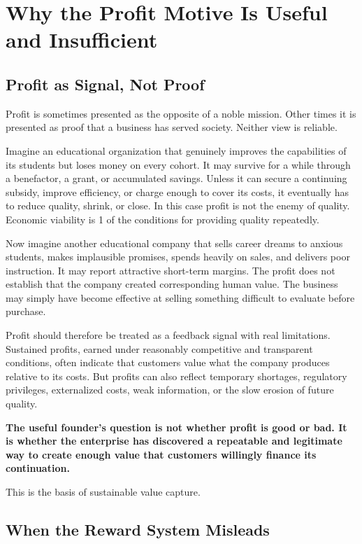 \section{Why the Profit Motive Is Useful and Insufficient}

\subsection{Profit as Signal, Not Proof}

Profit is sometimes presented as the opposite of a noble mission. Other times it is presented as proof that a business has served society. Neither view is reliable.

Imagine an educational organization that genuinely improves the capabilities of its students but loses money on every cohort. It may survive for a while through a benefactor, a grant, or accumulated savings. Unless it can secure a continuing subsidy, improve efficiency, or charge enough to cover its costs, it eventually has to reduce quality, shrink, or close. In this case profit is not the enemy of quality. Economic viability is 1 of the conditions for providing quality repeatedly.

Now imagine another educational company that sells career dreams to anxious students, makes implausible promises, spends heavily on sales, and delivers poor instruction. It may report attractive short-term margins. The profit does not establish that the company created corresponding human value. The business may simply have become effective at selling something difficult to evaluate before purchase.

Profit should therefore be treated as a feedback signal with real limitations. Sustained profits, earned under reasonably competitive and transparent conditions, often indicate that customers value what the company produces relative to its costs. But profits can also reflect temporary shortages, regulatory privileges, externalized costs, weak information, or the slow erosion of future quality.

\textbf{The useful founder's question is not whether profit is good or bad. It is whether the enterprise has discovered a repeatable and legitimate way to create enough value that customers willingly finance its continuation.}

This is the basis of sustainable value capture.

\subsection{When the Reward System Misleads}

